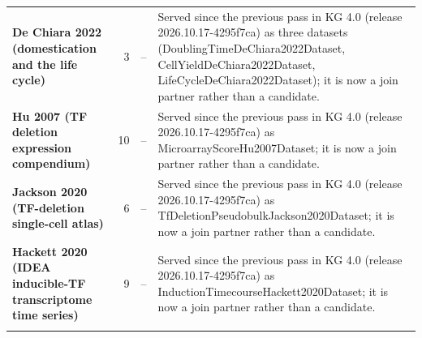 \begin{longtable}{@{}L{46mm} r@{\hspace{6pt}} r@{\hspace{6pt}} L{104mm}@{}}
\addlinespace[5pt]
\textbf{De Chiara 2022 (domestication and the life cycle)} & 3 & -- & Served since the previous pass in KG 4.0 (release 2026.10.17-4295f7ca) as three datasets (DoublingTimeDeChiara2022Dataset, CellYieldDeChiara2022Dataset, LifeCycleDeChiara2022Dataset); it is now a join partner rather than a candidate. \\
\addlinespace[5pt]
\textbf{Hu 2007 (TF deletion expression compendium)} & 10 & -- & Served since the previous pass in KG 4.0 (release 2026.10.17-4295f7ca) as MicroarrayScoreHu2007Dataset; it is now a join partner rather than a candidate. \\
\addlinespace[5pt]
\textbf{Jackson 2020 (TF-deletion single-cell atlas)} & 6 & -- & Served since the previous pass in KG 4.0 (release 2026.10.17-4295f7ca) as TfDeletionPseudobulkJackson2020Dataset; it is now a join partner rather than a candidate. \\
\addlinespace[5pt]
\textbf{Hackett 2020 (IDEA inducible-TF transcriptome time series)} & 9 & -- & Served since the previous pass in KG 4.0 (release 2026.10.17-4295f7ca) as InductionTimecourseHackett2020Dataset; it is now a join partner rather than a candidate. \\
\addlinespace[5pt]
\end{longtable}
\endgroup
